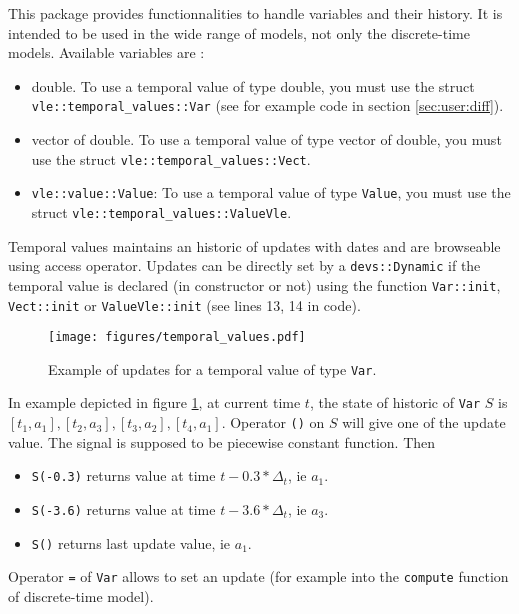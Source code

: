 \documentclass{article}
\theoremstyle{remark}
\begin{document}
This package provides functionnalities to handle variables and their history.
It is intended to be used in the wide range of models, not only
the discrete-time models.
Available variables are :
\begin{itemize}
  \item double. To use a temporal value of type double, you must use the struct 
  \texttt{vle::temporal\_values::Var} (see for example code in section 
  \ref{sec:user:diff}).
  \item vector of double. To use a temporal value of type vector of double,
    you must use the struct \texttt{vle::temporal\_values::Vect}.
  \item \texttt{vle::value::Value}: To use a temporal value of type
  \texttt{Value}, you must use the struct
  \texttt{vle::temporal\_values::ValueVle}.
\end{itemize}

Temporal values maintains an historic of updates with dates and
are browseable using access operator. Updates can be directly set
by a \texttt{devs::Dynamic} if the temporal value is declared 
(in constructor or not) using the function \texttt{Var::init}, 
\texttt{Vect::init} or \texttt{ValueVle::init} (see lines 13, 14 in code).
 
\begin{figure}[!h]
\begin{center} 
\texttt{[image: figures/temporal\_values.pdf]}
\caption{\label{fig:temp} Example of updates for a temporal value of type
 \texttt{Var}.}
\end{center}
\end{figure}

In example depicted in figure \ref{fig:temp}, at current time $t$, the state
of historic of \texttt{Var} $S$ is $[t_1, a_1],[t_2, a_3],[t_3, a_2],[t_4, a_1]$.
Operator \texttt{()} on $S$ will give one of the update value. The signal is 
supposed to be piecewise constant function. Then 
\begin{itemize}
  \item \texttt{S(-0.3)} returns value at time $t - 0.3 * \Delta_t$, ie $a_1$.
  \item \texttt{S(-3.6)} returns value at time $t - 3.6 * \Delta_t$, ie $a_3$.
  \item \texttt{S()} returns last update value, ie $a_1$.
\end{itemize}
Operator \texttt{=} of \texttt{Var} allows to set an update
(for example into the \texttt{compute} function of discrete-time model).
\end{document}
